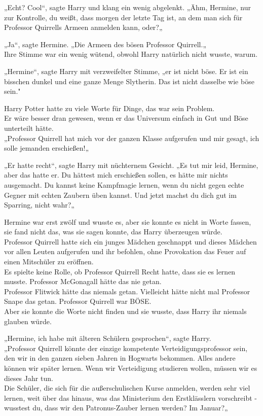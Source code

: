 {„Echt? Cool“, sagte Harry und klang ein wenig abgelenkt. „Ähm, Hermine, nur zur Kontrolle, du weißt, dass morgen der letzte Tag ist, an dem man sich für Professor Quirrells Armeen anmelden kann, oder?„

„Ja“, sagte Hermine. „Die Armeen des bösen Professor Quirrell.„\\ Ihre Stimme war ein wenig wütend, obwohl Harry natürlich nicht wusste, warum.

„Hermine“, sagte Harry mit verzweifelter Stimme, „er ist nicht böse. Er ist ein bisschen dunkel und eine ganze Menge Slytherin. Das ist nicht dasselbe wie böse sein."

Harry Potter hatte zu viele Worte für Dinge, das war sein Problem.\\ Er wäre besser dran gewesen, wenn er das Universum einfach in Gut und Böse unterteilt hätte.\\ „Professor Quirrell hat mich vor der ganzen Klasse aufgerufen und mir gesagt, ich solle jemanden erschießen!„

„Er hatte recht“, sagte Harry mit nüchternem Gesicht. „Es tut mir leid, Hermine, aber das hatte er. Du hättest mich erschießen sollen, es hätte mir nichts ausgemacht. Du kannst keine Kampfmagie lernen, wenn du nicht gegen echte Gegner mit echten Zaubern üben kannst. Und jetzt machst du dich gut im Sparring, nicht wahr?„

Hermine war erst zwölf und wusste es, aber sie konnte es nicht in Worte fassen, sie fand nicht das, was sie sagen konnte, das Harry überzeugen würde.\\ Professor Quirrell hatte sich ein junges Mädchen geschnappt und dieses Mädchen vor allen Leuten aufgerufen und ihr befohlen, ohne Provokation das Feuer auf einen Mitschüler zu eröffnen.\\ Es spielte keine Rolle, ob Professor Quirrell Recht hatte, dass sie es lernen musste. Professor McGonagall hätte das nie getan.\\ Professor Flitwick hätte das niemals getan. Vielleicht hätte nicht mal Professor Snape das getan. Professor Quirrell war BÖSE.\\ Aber sie konnte die Worte nicht finden und sie wusste, dass Harry ihr niemals glauben würde.

„Hermine, ich habe mit älteren Schülern gesprochen“, sagte Harry.\\ „Professor Quirrell könnte der einzige kompetente Verteidigungsprofessor sein, den wir in den ganzen sieben Jahren in Hogwarts bekommen. Alles andere können wir später lernen. Wenn wir Verteidigung studieren wollen, müssen wir es dieses Jahr tun.\\ Die Schüler, die sich für die außerschulischen Kurse anmelden, werden sehr viel lernen, weit über das hinaus, was das Ministerium den Erstklässlern vorschreibt - wusstest du, dass wir den Patronus-Zauber lernen werden? Im Januar?„

}

